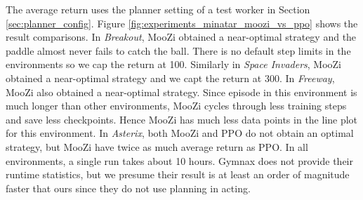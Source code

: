 The average return uses the planner setting of a test worker in Section \ref{sec:planner_config}.
Figure \ref{fig:experiments_minatar_moozi_vs_ppo} shows the result comparisons.
In \textit{Breakout}, MooZi obtained a near-optimal strategy and the paddle almost never fails to catch the ball.
There is no default step limits in the environments so we cap the return at 100.
Similarly in \textit{Space Invaders}, MooZi obtained a near-optimal strategy and we capt the return at 300.
In \textit{Freeway}, MooZi also obtained a near-optimal strategy.
Since episode in this environment is much longer than other environments, MooZi cycles through less training steps and save less checkpoints.
Hence MooZi has much less data points in the line plot for this environment.
In \textit{Asterix}, both MooZi and PPO do not obtain an optimal strategy, but MooZi have twice as much average return as PPO.
In all environments, a single run takes about 10 hours.
Gymnax does not provide their runtime statistics, but we presume their result is at least an order of magnitude faster that ours since they do not use planning in acting.



